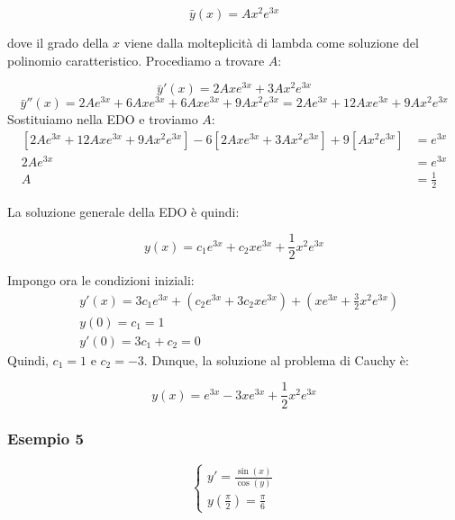 \[
    \bar{y} (x) = Ax^{2}e^{3x}
\]

dove il grado della \(x\) viene dalla molteplicità di lambda come soluzione del polinomio caratteristico. Procediamo a trovare \(A\):

\[
    \bar{y}'(x) = 2Axe^{3x} + 3Ax^{2}e^{3x}
\]
\[
    \bar{y}''(x) = 2Ae^{3x} + 6Axe^{3x} + 6Axe^{3x} + 9Ax^2e^{3x} = 2Ae^{3x} + 12Axe^{3x} + 9Ax^2e^{3x}
\]
Sostituiamo nella EDO e troviamo \(A\):
\begin{align*}
    \left[ 2Ae^{3x} + 12Axe^{3x} + 9Ax^2e^{3x} \right] -6\left[ 2Axe^{3x} + 3Ax^{2}e^{3x} \right] + 9 \left[ Ax^{2}e^{3x} \right] & = e^{3x}      \\
    2Ae^{3x}                                                                                                                      & = e^{3x}      \\
    A                                                                                                                             & = \frac{1}{2}
\end{align*}

La soluzione generale della EDO è quindi:

\[
    y(x) = c_1 e ^{3x}+ c_2 x e ^{3x} + \frac{1}{2} x^{2}e ^{3x}
\]

Impongo ora le condizioni iniziali:
\begin{align*}
     & y'(x) = 3c_1 e ^{3x}+ \left( c_2 e ^{3x} + 3c_2 x e ^{3x} \right) + \left( xe ^{3x} + \frac{3}{2} x^{2}e ^{3x} \right) \\
     & y(0) = c_1 = 1                                                                                                         \\
     & y'(0) = 3c_1 + c_2 = 0
\end{align*}
Quindi, \(c_1 = 1\) e \(c_2 = -3\). Dunque, la soluzione al problema di Cauchy è:

\[
    y(x) = e^{3x} -3xe^{3x} +\frac{1}{2}x^{2}e^{3x}
\]

\filbreak{}
\subsubsection*{Esempio 5}

\begin{equation*}
    \begin{cases*}
        y'= \frac{\sin(x)}{\cos(y)} \\
        y\left( \frac{\pi}{2} \right) = \frac{\pi}{6}
    \end{cases*}
\end{equation*}


